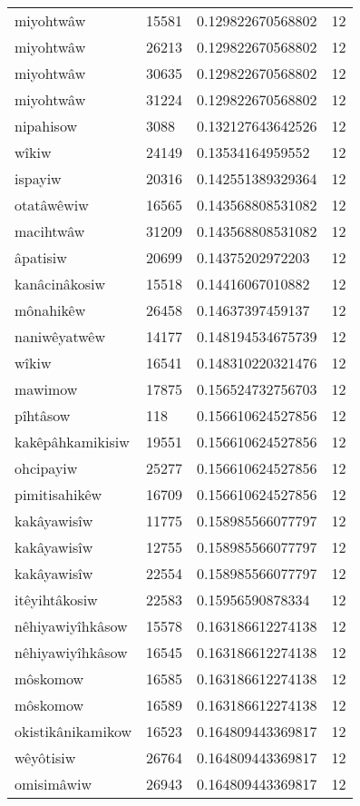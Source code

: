 \begin{longtable}{llll}
miyohtwâw & 15581 & 0.129822670568802 & 12 \\
miyohtwâw & 26213 & 0.129822670568802 & 12 \\
miyohtwâw & 30635 & 0.129822670568802 & 12 \\
miyohtwâw & 31224 & 0.129822670568802 & 12 \\
nipahisow & 3088 & 0.132127643642526 & 12 \\
wîkiw & 24149 & 0.13534164959552 & 12 \\
ispayiw & 20316 & 0.142551389329364 & 12 \\
otatâwêwiw & 16565 & 0.143568808531082 & 12 \\
macihtwâw & 31209 & 0.143568808531082 & 12 \\
âpatisiw & 20699 & 0.14375202972203 & 12 \\
kanâcinâkosiw & 15518 & 0.14416067010882 & 12 \\
mônahikêw & 26458 & 0.14637397459137 & 12 \\
naniwêyatwêw & 14177 & 0.148194534675739 & 12 \\
wîkiw & 16541 & 0.148310220321476 & 12 \\
mawimow & 17875 & 0.156524732756703 & 12 \\
pîhtâsow & 118 & 0.156610624527856 & 12 \\
kakêpâhkamikisiw & 19551 & 0.156610624527856 & 12 \\
ohcipayiw & 25277 & 0.156610624527856 & 12 \\
pimitisahikêw & 16709 & 0.156610624527856 & 12 \\
kakâyawisîw & 11775 & 0.158985566077797 & 12 \\
kakâyawisîw & 12755 & 0.158985566077797 & 12 \\
kakâyawisîw & 22554 & 0.158985566077797 & 12 \\
itêyihtâkosiw & 22583 & 0.15956590878334 & 12 \\
nêhiyawiyîhkâsow & 15578 & 0.163186612274138 & 12 \\
nêhiyawiyîhkâsow & 16545 & 0.163186612274138 & 12 \\
môskomow & 16585 & 0.163186612274138 & 12 \\
môskomow & 16589 & 0.163186612274138 & 12 \\
okistikânikamikow & 16523 & 0.164809443369817 & 12 \\
wêyôtisiw & 26764 & 0.164809443369817 & 12 \\
omisimâwiw & 26943 & 0.164809443369817 & 12 \\

\end{longtable}
